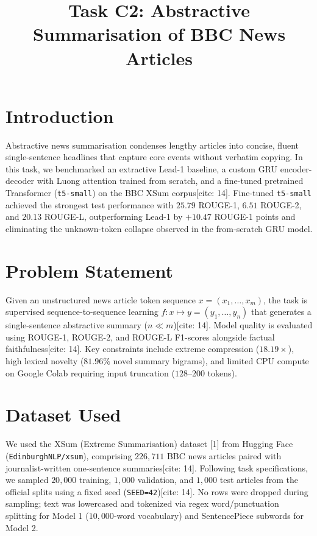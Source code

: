\documentclass[10pt,twocolumn,a4paper]{IEEEtran}
\title{\vspace{-0.3cm}Task C2: Abstractive Summarisation of BBC News Articles\vspace{-0.2cm}}
\author{
    \IEEEauthorblockN{KAINAT \quad Roll No. 70176544 \quad | \quad Section C}
    \IEEEauthorblockA{
        Department of Intelligent Systems, The University of Lahore \quad | \quad AI-101 Intro to AI (Instructor: Dr. Muhammad Awais) \\
        Repository: \url{https://github.com/70176544-sketch/AI101-ML-Assignment-70176544}
    }
}
\begin{document}
\maketitle

\section{Introduction}
Abstractive news summarisation condenses lengthy articles into concise, fluent single-sentence headlines that capture core events without verbatim copying. In this task, we benchmarked an extractive Lead-1 baseline, a custom GRU encoder-decoder with Luong attention trained from scratch, and a fine-tuned pretrained Transformer (\texttt{t5-small}) on the BBC XSum corpus[cite: 14]. Fine-tuned \texttt{t5-small} achieved the strongest test performance with $25.79$ ROUGE-1, $6.51$ ROUGE-2, and $20.13$ ROUGE-L, outperforming Lead-1 by $+10.47$ ROUGE-1 points and eliminating the unknown-token collapse observed in the from-scratch GRU model.

\section{Problem Statement}
Given an unstructured news article token sequence $x = (x_1, \dots, x_m)$, the task is supervised sequence-to-sequence learning $f: x \mapsto y = (y_1, \dots, y_n)$ that generates a single-sentence abstractive summary ($n \ll m$)[cite: 14]. Model quality is evaluated using ROUGE-1, ROUGE-2, and ROUGE-L F1-scores alongside factual faithfulness[cite: 14]. Key constraints include extreme compression ($18.19\times$), high lexical novelty ($81.96\%$ novel summary bigrams), and limited CPU compute on Google Colab requiring input truncation ($128$--$200$ tokens).

\section{Dataset Used}
We used the XSum (Extreme Summarisation) dataset [1] from Hugging Face (\texttt{EdinburghNLP/xsum}), comprising $226,711$ BBC news articles paired with journalist-written one-sentence summaries[cite: 14]. Following task specifications, we sampled $20,000$ training, $1,000$ validation, and $1,000$ test articles from the official splits using a fixed seed (\texttt{SEED=42})[cite: 14]. No rows were dropped during sampling; text was lowercased and tokenized via regex word/punctuation splitting for Model 1 ($10,000$-word vocabulary) and SentencePiece subwords for Model 2.
\end{document}
